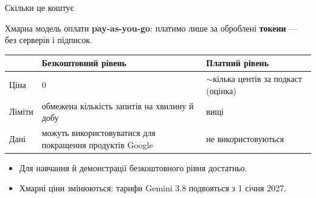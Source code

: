 \documentclass[aspectratio=43]{beamer}
\newcommand{\thesis}[1]{\begin{block}{}#1\end{block}}
\begin{document}
\begin{frame}{Скільки це коштує}
  \thesis{Хмарна модель оплати \textbf{pay-as-you-go}: платимо лише за
    оброблені \textbf{токени} --- без серверів і підписок.}

  \small
  \begin{tabular}{@{}>{\raggedright}p{}>{\raggedright}p{}
                    >{\raggedright\arraybackslash}p{}@{}}
    \toprule
    & \textbf{Безкоштовний рівень} & \textbf{Платний рівень} \\
    \midrule
    Ціна & 0 & $\sim$кілька центів за подкаст (оцінка) \\
    Ліміти & обмежена кількість запитів на хвилину й добу & вищі \\
    Дані & можуть використовуватися для покращення продуктів Google &
      не використовуються \\
    \bottomrule
  \end{tabular}
  \normalsize

  \vspace{0.5em}
  \begin{itemize}\small
    \item Для навчання й демонстрації безкоштовного рівня достатньо.
    \item Хмарні ціни змінюються: тарифи Gemini 3.8 подвояться з 1 січня 2027.
  \end{itemize}
\end{frame}
\end{document}
